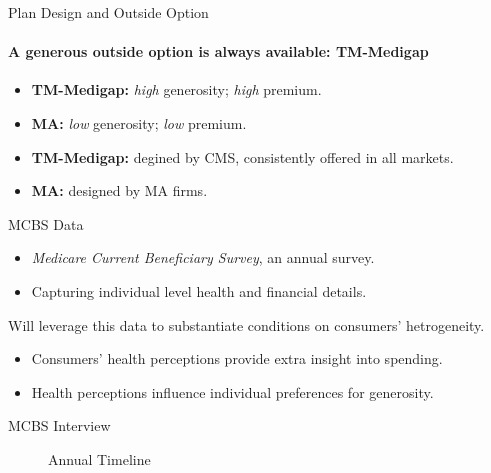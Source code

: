 \begin{frame}{Plan Design and Outside Option}
    \framesubtitle{\textcolor{structure}{A generous outside option is always available: TM-Medigap}}
    \begin{itemize}
        \item \textbf{TM-Medigap:} \textit{high} generosity; \textit{high} premium.
        \item \textbf{MA:} \textit{low} generosity; \textit{low} premium.
        \vfill
        \item \textbf{TM-Medigap:} degined by CMS, consistently offered in all markets.
        \item \textbf{MA:} designed by MA firms.
    \end{itemize}
    \vfill
\end{frame}


\begin{frame}{MCBS Data}

    \begin{itemize}
        \item \textit{Medicare Current Beneficiary Survey}, an annual survey.
        \item Capturing individual level health and financial details.
    \end{itemize}
    \vfill
   Will leverage this data to substantiate conditions on consumers' hetrogeneity.
    \begin{itemize}
        \item \textcolor{structure}{Consumers' health perceptions provide extra insight into spending.}
        \item \textcolor{structure}{Health perceptions influence individual preferences for generosity.}
    \end{itemize}

\end{frame}



\begin{frame}{MCBS Interview}
\begin{figure}
    \centering
    
    \caption{Annual Timeline}
\end{figure}
\end{frame}


